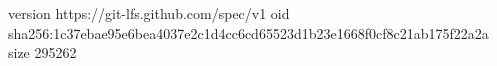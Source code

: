 version https://git-lfs.github.com/spec/v1
oid sha256:1c37ebae95e6bea4037e2c1d4cc6cd65523d1b23e1668f0cf8c21ab175f22a2a
size 295262
